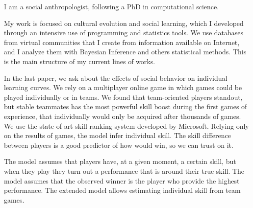 
I am a social anthropologist, following a PhD in computational science. 

%

My work is focused on cultural evolution and social learning, which I developed through an intensive use of programming and statistics tools.
We use databases from virtual communities that I create from information available on Internet, and I analyze them with Bayesian Inference and others statistical methods.
This is the main structure of my current lines of works.

%

In the last paper, we ask about the effects of social behavior on individual learning curves.
We rely on a multiplayer online game in which games could be played individually or in teams.
We found that team-oriented players standout, but stable teammates has the most powerful skill boost during the first games of experience, that individually would only be acquired after thousands of games.
We use the state-of-art skill ranking system developed by Microsoft.
Relying only on the results of games, the model infer individual skill.
The skill difference between players is a good predictor of how would win, so we can trust on it.

% 

The model assumes that players have, at a given moment, a certain  skill, but when they play they turn out a performance that is around their true skill.
The model assumes that the observed winner is the player who provide the highest performance.
The extended model allows estimating individual skill from team games.

